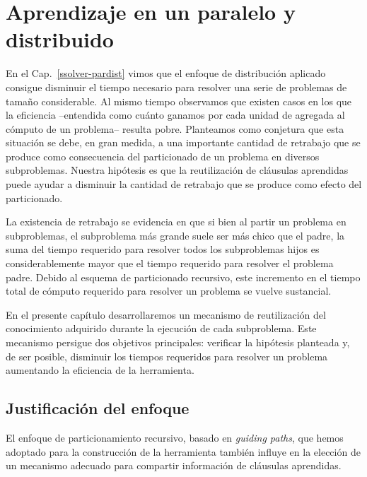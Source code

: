 \chapter{Aprendizaje en un \ssolver paralelo y distribuido}
\label{aprendizaje-pardist}

En el Cap.~\ref{ssolver-pardist} vimos que el enfoque de distribución aplicado
consigue disminuir el tiempo necesario para resolver una serie de problemas de
tamaño considerable. Al mismo tiempo observamos que existen casos en los que
la eficiencia --entendida como cuánto ganamos por cada unidad de \hard
agregada al cómputo de un problema-- resulta pobre. Planteamos como conjetura
que esta situación se debe, en gran medida, a una importante cantidad de
retrabajo que se produce como consecuencia del particionado de un problema en
diversos subproblemas. Nuestra hipótesis es que la reutilización de cláusulas
aprendidas puede ayudar a disminuir la cantidad de retrabajo que se produce
como efecto del particionado.

La existencia de retrabajo se evidencia en que si bien al partir un problema
en subproblemas, el subproblema más grande suele ser más chico que el padre,
la suma del tiempo requerido para resolver todos los subproblemas hijos es
considerablemente mayor que el tiempo requerido para resolver el problema
padre. Debido al esquema de particionado recursivo, este incremento en el
tiempo total de cómputo requerido para resolver un problema se vuelve
sustancial.

En el presente capítulo desarrollaremos un mecanismo de reutilización del
conocimiento adquirido durante la ejecución de cada subproblema. Este
mecanismo persigue dos objetivos principales: verificar la hipótesis planteada
y, de ser posible,  disminuir los tiempos requeridos para resolver un problema
aumentando la eficiencia de la herramienta.

\section{Justificación del enfoque}

El enfoque de particionamiento recursivo, basado en \emph{guiding paths}, que
hemos adoptado para la construcción de la herramienta también influye en la
elección de un mecanismo adecuado para compartir información de cláusulas
aprendidas. 

\newcommand{\roottask}{\ensuremath{<\varphi_R, \emptyset>}\xspace}
\newcommand{\task}{\ensuremath{<\varphi, \emptyset>}\xspace}
\newcommand{\nonemptytask}{\ensuremath{<\varphi, C>}\xspace}

